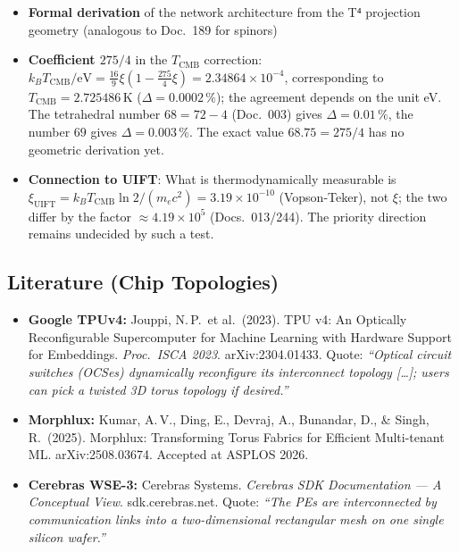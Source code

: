 \begin{itemize}
  \item \textbf{Formal derivation} of the network architecture from the
        T⁴ projection geometry (analogous to Doc.~189 for spinors)

  \item \textbf{Coefficient $275/4$} in the $T_\text{CMB}$ correction:
        $k_BT_\text{CMB}/\text{eV} = \tfrac{16}{9}\xi(1 - \tfrac{275}{4}\xi) = 2.34864\times10^{-4}$,
        corresponding to $T_\text{CMB} = 2.725486\,\text{K}$ ($\Delta = 0.0002\,\%$);
        the agreement depends on the unit eV. The tetrahedral number $68 = 72-4$ (Doc.~003) gives
        $\Delta = 0.01\,\%$, the number $69$ gives $\Delta = 0.003\,\%$.
        The exact value $68.75 = 275/4$ has no geometric derivation yet.

  \item \textbf{Connection to UIFT}: What is thermodynamically measurable is
        $\xi_\text{UIFT} = k_BT_\text{CMB}\ln2/(m_ec^2) = 3.19\times10^{-10}$
        (Vopson-Teker), not $\xi$; the two differ by the factor
        $\approx 4.19\times10^{5}$ (Docs.~013/244). The priority direction
        remains undecided by such a test.
\end{itemize}

\subsection*{Literature (Chip Topologies)}

\begin{itemize}\small
  \item \textbf{Google TPUv4:} Jouppi, N.\,P.\ et al.\ (2023).
        TPU v4: An Optically Reconfigurable Supercomputer for Machine
        Learning with Hardware Support for Embeddings.
        \textit{Proc.\ ISCA 2023}. arXiv:2304.01433.
        Quote: \textit{``Optical circuit switches (OCSes) dynamically
        reconfigure its interconnect topology [\ldots]; users can pick
        a twisted 3D torus topology if desired.''}

  \item \textbf{Morphlux:} Kumar, A.\,V., Ding, E., Devraj, A.,
        Bunandar, D., \& Singh, R.\ (2025).
        Morphlux: Transforming Torus Fabrics for Efficient
        Multi-tenant ML. arXiv:2508.03674. Accepted at ASPLOS 2026.

  \item \textbf{Cerebras WSE-3:} Cerebras Systems.
        \textit{Cerebras SDK Documentation --- A Conceptual View}.
        sdk.cerebras.net. Quote: \textit{``The PEs are interconnected
        by communication links into a two-dimensional rectangular
        mesh on one single silicon wafer.''}
\end{itemize}


